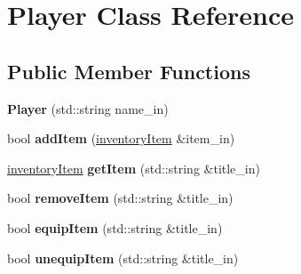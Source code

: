 \hypertarget{class_player}{}\section{Player Class Reference}
\label{class_player}
\subsection*{Public Member Functions}
\begin{DoxyCompactItemize}
\item 
\mbox{\label{class_player_a09ad6fcbd585f8dc6dc19c64c353f787}} 
{\bfseries Player} (std\+::string name\+\_\+in)
\item 
\mbox{\label{class_player_ad8a4772cdddd39a4eda4ebf853de15b9}} 
bool {\bfseries add\+Item} (\hyperlink{structinventory_item}{inventory\+Item} \&item\+\_\+in)
\item 
\mbox{\label{class_player_a3706ea633f2fb1cfa8d167464cd06dcf}} 
\hyperlink{structinventory_item}{inventory\+Item} {\bfseries get\+Item} (std\+::string \&title\+\_\+in)
\item 
\mbox{\label{class_player_ab375f1c4991d4fd26abbd53e92d297ee}} 
bool {\bfseries remove\+Item} (std\+::string \&title\+\_\+in)
\item 
\mbox{\label{class_player_acfd1586281be8165d8d04a8d25438a95}} 
bool {\bfseries equip\+Item} (std\+::string \&title\+\_\+in)
\item 
\mbox{\label{class_player_a32eccf8f5cea5d298cb862f3a482924e}} 
bool {\bfseries unequip\+Item} (std\+::string \&title\+\_\+in)
\end{DoxyCompactItemize}

